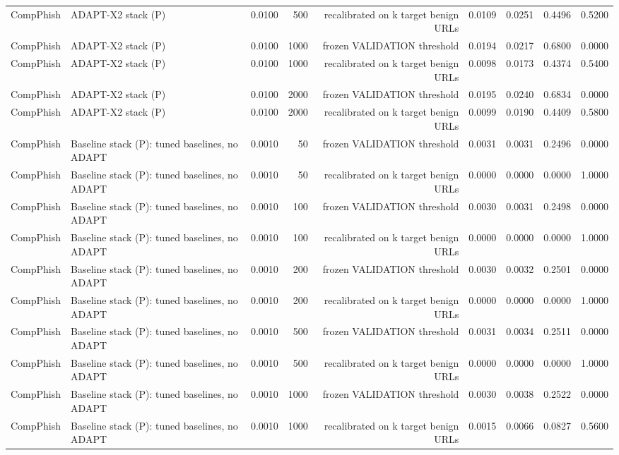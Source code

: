 \begin{table}[t]
\begin{tabular}{llrrrrrrr}
CompPhish & ADAPT-X2 stack (P) & 0.0100 & 500 & recalibrated on k target benign URLs & 0.0109 & 0.0251 & 0.4496 & 0.5200 \\
CompPhish & ADAPT-X2 stack (P) & 0.0100 & 1000 & frozen VALIDATION threshold & 0.0194 & 0.0217 & 0.6800 & 0.0000 \\
CompPhish & ADAPT-X2 stack (P) & 0.0100 & 1000 & recalibrated on k target benign URLs & 0.0098 & 0.0173 & 0.4374 & 0.5400 \\
CompPhish & ADAPT-X2 stack (P) & 0.0100 & 2000 & frozen VALIDATION threshold & 0.0195 & 0.0240 & 0.6834 & 0.0000 \\
CompPhish & ADAPT-X2 stack (P) & 0.0100 & 2000 & recalibrated on k target benign URLs & 0.0099 & 0.0190 & 0.4409 & 0.5800 \\
CompPhish & Baseline stack (P): tuned baselines, no ADAPT & 0.0010 & 50 & frozen VALIDATION threshold & 0.0031 & 0.0031 & 0.2496 & 0.0000 \\
CompPhish & Baseline stack (P): tuned baselines, no ADAPT & 0.0010 & 50 & recalibrated on k target benign URLs & 0.0000 & 0.0000 & 0.0000 & 1.0000 \\
CompPhish & Baseline stack (P): tuned baselines, no ADAPT & 0.0010 & 100 & frozen VALIDATION threshold & 0.0030 & 0.0031 & 0.2498 & 0.0000 \\
CompPhish & Baseline stack (P): tuned baselines, no ADAPT & 0.0010 & 100 & recalibrated on k target benign URLs & 0.0000 & 0.0000 & 0.0000 & 1.0000 \\
CompPhish & Baseline stack (P): tuned baselines, no ADAPT & 0.0010 & 200 & frozen VALIDATION threshold & 0.0030 & 0.0032 & 0.2501 & 0.0000 \\
CompPhish & Baseline stack (P): tuned baselines, no ADAPT & 0.0010 & 200 & recalibrated on k target benign URLs & 0.0000 & 0.0000 & 0.0000 & 1.0000 \\
CompPhish & Baseline stack (P): tuned baselines, no ADAPT & 0.0010 & 500 & frozen VALIDATION threshold & 0.0031 & 0.0034 & 0.2511 & 0.0000 \\
CompPhish & Baseline stack (P): tuned baselines, no ADAPT & 0.0010 & 500 & recalibrated on k target benign URLs & 0.0000 & 0.0000 & 0.0000 & 1.0000 \\
CompPhish & Baseline stack (P): tuned baselines, no ADAPT & 0.0010 & 1000 & frozen VALIDATION threshold & 0.0030 & 0.0038 & 0.2522 & 0.0000 \\
CompPhish & Baseline stack (P): tuned baselines, no ADAPT & 0.0010 & 1000 & recalibrated on k target benign URLs & 0.0015 & 0.0066 & 0.0827 & 0.5600 \\

\end{tabular}
\end{table}

